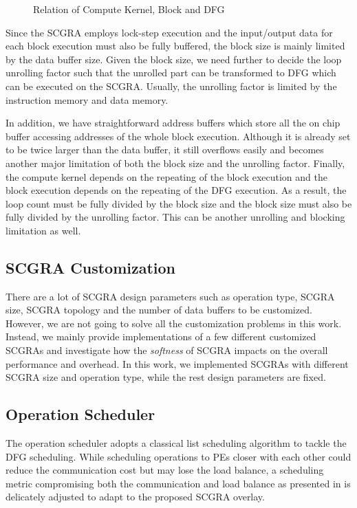 \begin{figure}[htb]
\caption{Relation of Compute Kernel, Block and DFG}
\label{fig:blocking-and-dfg-gen}
\end{figure}

Since the SCGRA employs lock-step execution and the input/output data for each block execution must also be fully buffered, the block size is mainly limited by the data buffer size. Given the block size, we need further to decide the loop unrolling factor such that the unrolled part can be transformed to DFG which can be executed on the SCGRA. Usually, the unrolling factor is limited by the instruction memory and data memory. 

In addition, we have straightforward address buffers which store all the on chip buffer accessing addresses of the whole block execution. Although it is already set to be twice larger than the data buffer, it still overflows easily and becomes another major limitation of both the block size and the unrolling factor. Finally, the compute kernel depends on the repeating of the block execution and the block execution depends on the repeating of the DFG execution. As a result, the loop count must be fully divided by the block size and the block size must also be fully divided by the unrolling factor. This can be another unrolling and blocking limitation as well. 

\subsection{SCGRA Customization}
There are a lot of SCGRA design parameters such as operation type, SCGRA size, SCGRA topology and the number of data buffers to be customized. However, we are not going to solve all the customization problems in this work. Instead, we mainly provide implementations of a few different customized SCGRAs and investigate how the \emph{softness} of SCGRA impacts on the overall performance and overhead. In this work, we implemented SCGRAs with different SCGRA size and operation type, while the rest design parameters are fixed. 
   
\subsection{Operation Scheduler}
The operation scheduler adopts a classical list scheduling algorithm \cite{schutten1996list} to tackle the DFG scheduling. While scheduling operations to PEs closer with each other could reduce the communication cost but may lose the load balance, a scheduling metric compromising both the communication and load balance as presented in \cite{colinheart} is delicately adjusted to adapt to the proposed SCGRA overlay.    

